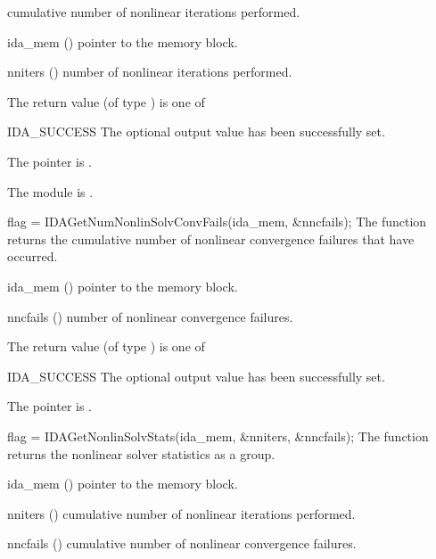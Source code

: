 {{  cumulative number of nonlinear iterations performed.
}
{
  \begin{args}[nniters]
  \item[ida\_mem] ()
    pointer to the {\ida} memory block.
  \item[nniters] ()
    number of nonlinear iterations performed.
  \end{args}
}
{
  The return value  (of type ) is one of
  \begin{args}
  \item[IDA\_SUCCESS]
    The optional output value has been successfully set.
  \item[\Id{IDA\_MEM\_NULL}]
    The  pointer is .
  \item[\Id{IDA\_MEM\_FAIL}]
    The {\sunnonlinsol} module is .
  \end{args}
}
{}
{
  flag = IDAGetNumNonlinSolvConvFails(ida\_mem, \&nncfails);
}
{
  The function  returns the
  cumulative number of nonlinear convergence failures that have occurred.
}
{
  \begin{args}[nncfails]
  \item[ida\_mem] ()
    pointer to the {\ida} memory block.
  \item[nncfails] ()
    number of nonlinear convergence failures.
  \end{args}
}
{
  The return value  (of type ) is one of
  \begin{args}
  \item[IDA\_SUCCESS]
    The optional output value has been successfully set.
  \item[\Id{IDA\_MEM\_NULL}]
    The  pointer is .
  \end{args}
}
{}
{
  flag = IDAGetNonlinSolvStats(ida\_mem, \&nniters, \&nncfails);
}
{
  The function  returns the
  {\ida} nonlinear solver statistics as a group.
}
{
  \begin{args}[nncfails]
  \item[ida\_mem] ()
    pointer to the {\ida} memory block.
  \item[nniters] ()
    cumulative number of nonlinear iterations performed.
  \item[nncfails] ()
    cumulative number of nonlinear convergence failures.

\end{args}}}
